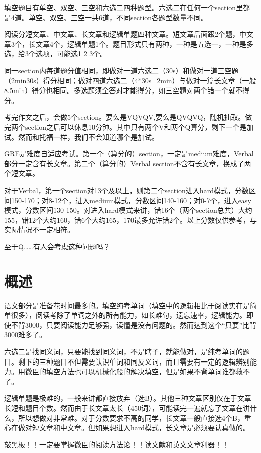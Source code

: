 \documentclass[cn,plain]{./src/qyxfbook}
\begin{document}
填空题目有单空、双空、三空和六选二四种题型。六选二在任何一个section里都是4道。单空、双空、三空一共6道，不同section各题型数量不同。

阅读分短文章、中文章、长文章和逻辑单题四种文章。短文章后面跟2个题，中文章3个，长文章4个，逻辑单题1个。题目形式只有两种，一种是五选一，一种是多选，给3个选项，可能选1
2 3个。

同一section内每道题分值相同，即做对一道六选二（30s）和做对一道三空题（2min30s）得分相同；做对四道六选二（4*30s=2min）与做对一篇长文章（一般8.5min）得分也相同。多选题须全答对才能得分，如三空题对两个错一个就不得分。

考完作文之后，会做5个section。要么是VQVQV,要么是QVQVQ，随机抽取。做完两个section之后可以休息10分钟。其中只有两个V和两个Q算分，剩下一个是加试。然而和托福一样，我们不会知道哪个是加试。

GRE是难度自适应考试。第一个（算分的）section，一定是medium难度，Verbal部分一定含有长文章。第二个（算分的）Verbal
section不含有长文章，换成了两个短文章。

对于Verbal，第一个section对13个及以上，则第二个section进入hard模式，分数区间150-170；对8-12个，进入medium模式，分数区间140-160；对0-7个，进入easy模式，分数区间130-150。对进入hard模式来讲，错16个（两个section总共）大约155，错12个大约160，错6个大约165，170最多允许错2个。以上分数仅供参考，与实际情况不一定相符。

至于Q……有人会考虑这种问题吗？

\section{概述}
语文部分是准备花时间最多的。填空纯考单词（填空中的逻辑相比于阅读实在是简单很多），阅读考除了单词之外的所有能力，如长难句，遗忘速率，逻辑能力。即使不背3000，只要阅读能力足够强，读懂是没有问题的。然而达到这个``只要''比背3000难多了。

六选二是找同义词，只要能找到同义词，不是瞎子，就能做对，是纯考单词的题目。剩下的三种题目不但需要认识单词和同反义词，而且需要有一定的逻辑辨别能力。用微臣的填空方法也可以机械化般的解决填空，但是如果不背单词谁都救不了。

逻辑单题是极难的，一般来讲都直接放弃（选B）。其他三种文章区别仅在于文章长短和题目个数。然而由于长文章太长（450词），可能读完一遍就忘了文章在讲什么，所以想做对非常难。对于分数要求不高的同学，长文章一般直接选4个B，重心在做对短文章和中文章。但如果想进入hard模式，长文章是必须要认真做的。

敲黑板！！一定要掌握微臣的阅读方法论！！读文献和英文文章利器！！
\end{document}
